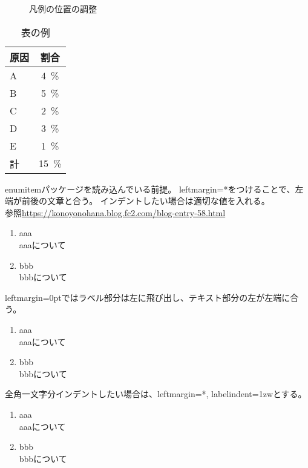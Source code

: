 \documentclass[uplatex, a4paper, dvipdfmx, 12pt]{jsreport}
\begin{document}
			\begin{figure}[H]
				\centering
				\caption{凡例の位置の調整}
			\end{figure}

			\begin{table}[H]
				\centering
				\caption{表の例}
				\begin{tabular}{l|c}
					\hline
					原因 & 割合\\
					\hline
					A & \SI{4}{\percent}\\
					B & \SI{5}{\percent}\\
					C & \SI{2}{\percent}\\
					D & \SI{3}{\percent}\\
					E & \SI{1}{\percent}\\
					\hline
					計 & \SI{15}{\percent}\\
					\hline
				\end{tabular}
			\end{table}

			enumitemパッケージを読み込んでいる前提。
			leftmargin=*をつけることで、左端が前後の文章と合う。
			インデントしたい場合は適切な値を入れる。\\
			参照\url{https://konoyonohana.blog.fc2.com/blog-entry-58.html}
			\begin{enumerate}[label={第\arabic*章}, leftmargin=*]
				\item aaa\\
					aaaについて
				\item bbb\\
					bbbについて
			\end{enumerate}
			leftmargin=0ptではラベル部分は左に飛び出し、テキスト部分の左が左端に合う。
			\begin{enumerate}[label={\arabic*.}, leftmargin=0pt]
				\item aaa\\
					aaaについて
				\item bbb\\
					bbbについて
			\end{enumerate}
			全角一文字分インデントしたい場合は、leftmargin=*, labelindent=1zwとする。
			\begin{enumerate}[leftmargin=*, labelindent=1zw]
				\item aaa\\
					aaaについて
				\item bbb\\
					bbbについて
			\end{enumerate}
\end{document}
